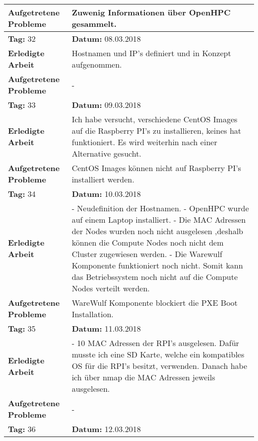 \begin{longtable}{|p{5cm}|p{5cm}p{6cm}|}
\textbf{Aufgetretene Probleme} & \multicolumn{2}{p{11cm}|}{Zuwenig Informationen über OpenHPC gesammelt.} \\ \hline
\rowcolor{heading}\textbf{Tag:} 32 & \textbf{Datum:} 08.03.2018 & \\ \hline
\textbf{Erledigte Arbeit} & \multicolumn{2}{p{11cm}|}{Hostnamen und IP's definiert und in Konzept aufgenommen.} \\ \hline
\textbf{Aufgetretene Probleme} & \multicolumn{2}{p{11cm}|}{-} \\ \hline
\rowcolor{heading}\textbf{Tag:} 33 & \textbf{Datum:} 09.03.2018 & \\ \hline
\textbf{Erledigte Arbeit} & \multicolumn{2}{p{11cm}|}{Ich habe versucht, verschiedene CentOS Images auf die Raspberry PI's zu installieren, keines hat funktioniert. Es wird weiterhin nach einer Alternative gesucht.} \\ \hline
\textbf{Aufgetretene Probleme} & \multicolumn{2}{p{11cm}|}{CentOS Images können nicht auf Raspberry PI's installiert werden.} \\ \hline
\rowcolor{heading}\textbf{Tag:} 34 & \textbf{Datum:} 10.03.2018 & \\ \hline
\textbf{Erledigte Arbeit} & \multicolumn{2}{p{11cm}|}{- Neudefinition der Hostnamen. \newline
- OpenHPC wurde auf einem Laptop installiert. \newline
- Die MAC Adressen der Nodes wurden noch nicht ausgelesen ,deshalb können die Compute Nodes noch nicht dem Cluster zugewiesen werden. \newline
- Die Warewulf Komponente funktioniert noch nicht. Somit kann das Betriebssystem noch nicht auf die Compute Nodes verteilt werden.} \\ \hline
\textbf{Aufgetretene Probleme} & \multicolumn{2}{p{11cm}|}{WareWulf Komponente blockiert die PXE Boot Installation.} \\ \hline
\rowcolor{heading}\textbf{Tag:} 35 & \textbf{Datum:} 11.03.2018 & \\ \hline
\textbf{Erledigte Arbeit} & \multicolumn{2}{p{11cm}|}{- 10 MAC Adressen der RPI's ausgelesen. Dafür musste ich eine SD Karte, welche ein kompatibles OS für die RPI's besitzt, verwenden. Danach habe ich über nmap die MAC Adressen jeweils ausgelesen.} \\ \hline
\textbf{Aufgetretene Probleme} & \multicolumn{2}{p{11cm}|}{-} \\ \hline
\rowcolor{heading}\textbf{Tag:} 36 & \textbf{Datum:} 12.03.2018 & \\ \hline

\end{longtable}
